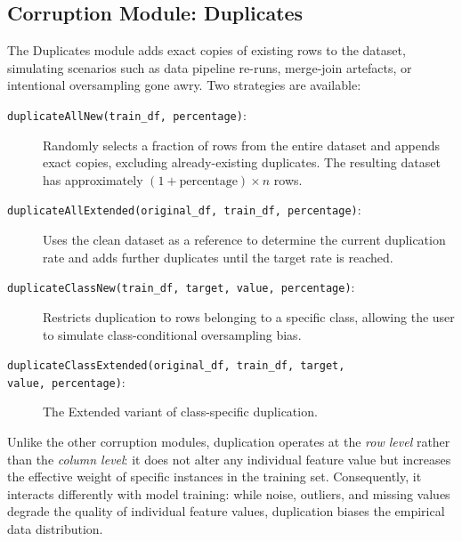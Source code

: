 \subsection{Corruption Module: Duplicates}
\label{sec:pucktrick-duplicates}

The Duplicates module adds exact copies of existing rows to the dataset,
simulating scenarios such as data pipeline re-runs, merge-join artefacts, or
intentional oversampling gone awry.  Two strategies are available:

\begin{description}
    \item[\texttt{duplicateAllNew(train\_df, percentage)}:]
        Randomly selects a fraction of rows from the entire dataset and
        appends exact copies, excluding already-existing duplicates.  The
        resulting dataset has approximately
        $(1 + \text{percentage}) \times n$ rows.

    \item[\texttt{duplicateAllExtended(original\_df, train\_df, percentage)}:]
        Uses the clean dataset as a reference to determine the current
        duplication rate and adds further duplicates until the target rate
        is reached.

    \item[\texttt{duplicateClassNew(train\_df, target, value, percentage)}:]
        Restricts duplication to rows belonging to a specific class, allowing
        the user to simulate class-conditional oversampling bias.

    \item[\texttt{duplicateClassExtended(original\_df, train\_df, target,}]
    \item[\texttt{value, percentage)}:]
        The Extended variant of class-specific duplication.
\end{description}

Unlike the other corruption modules, duplication operates at the \emph{row
level} rather than the \emph{column level}: it does not alter any individual
feature value but increases the effective weight of specific instances in the
training set.  Consequently, it interacts differently with model training: while
noise, outliers, and missing values degrade the quality of individual feature
values, duplication biases the empirical data distribution.

